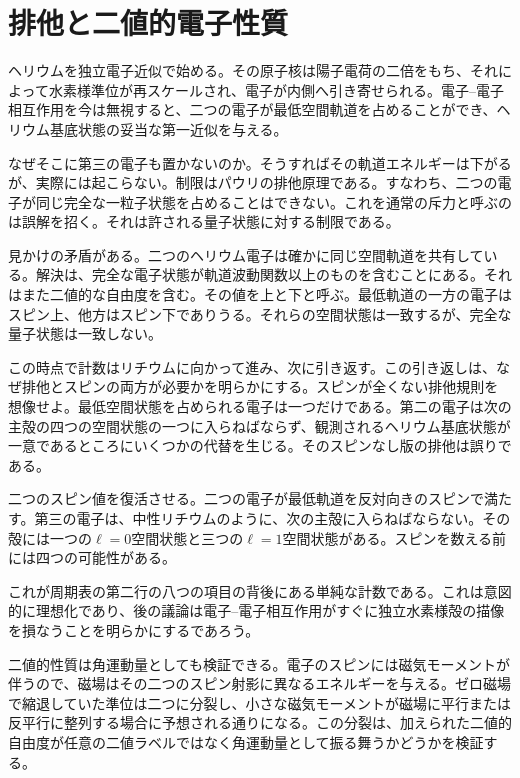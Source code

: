 \section{排他と二値的電子性質}

ヘリウムを独立電子近似で始める。その原子核は陽子電荷の二倍をもち、それによって水素様準位が再スケールされ、電子が内側へ引き寄せられる。電子--電子相互作用を今は無視すると、二つの電子が最低空間軌道を占めることができ、ヘリウム基底状態の妥当な第一近似を与える。

なぜそこに第三の電子も置かないのか。そうすればその軌道エネルギーは下がるが、実際には起こらない。制限はパウリの排他原理である。すなわち、二つの電子が同じ完全な一粒子状態を占めることはできない。これを通常の斥力と呼ぶのは誤解を招く。それは許される量子状態に対する制限である。

見かけの矛盾がある。二つのヘリウム電子は確かに同じ空間軌道を共有している。解決は、完全な電子状態が軌道波動関数以上のものを含むことにある。それはまた二値的な自由度を含む。その値を上と下と呼ぶ。最低軌道の一方の電子はスピン上、他方はスピン下でありうる。それらの空間状態は一致するが、完全な量子状態は一致しない。

この時点で計数はリチウムに向かって進み、次に引き返す。この引き返しは、なぜ排他とスピンの両方が必要かを明らかにする。スピンが全くない排他規則を想像せよ。最低空間状態を占められる電子は一つだけである。第二の電子は次の主殻の四つの空間状態の一つに入らねばならず、観測されるヘリウム基底状態が一意であるところにいくつかの代替を生じる。そのスピンなし版の排他は誤りである。

二つのスピン値を復活させる。二つの電子が最低軌道を反対向きのスピンで満たす。第三の電子は、中性リチウムのように、次の主殻に入らねばならない。その殻には一つの\(\ell=0\)空間状態と三つの\(\ell=1\)空間状態がある。スピンを数える前には四つの可能性がある。

\begin{classroomqa}
\end{classroomqa}

これが周期表の第二行の八つの項目の背後にある単純な計数である。これは意図的に理想化であり、後の議論は電子--電子相互作用がすぐに独立水素様殻の描像を損なうことを明らかにするであろう。

二値的性質は角運動量としても検証できる。電子のスピンには磁気モーメントが伴うので、磁場はその二つのスピン射影に異なるエネルギーを与える。ゼロ磁場で縮退していた準位は二つに分裂し、小さな磁気モーメントが磁場に平行または反平行に整列する場合に予想される通りになる。この分裂は、加えられた二値的自由度が任意の二値ラベルではなく角運動量として振る舞うかどうかを検証する。


